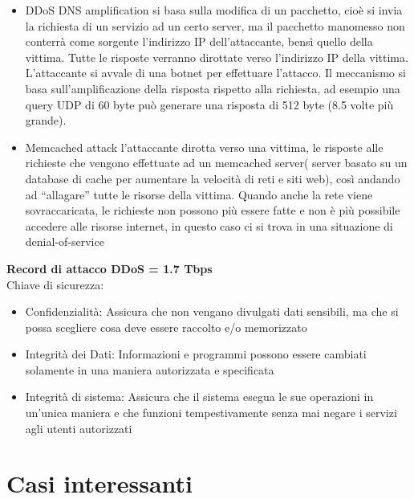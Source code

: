 \documentclass[8pt]{extarticle}
\begin{document}
\begin{itemize}
    \item DDoS DNS amplification si basa sulla modifica di un pacchetto, cioè si invia la richiesta di un servizio ad un certo server, 
    ma il pacchetto manomesso non conterrà come sorgente l’indirizzo IP dell’attaccante, bensì quello della vittima. Tutte le risposte 
    verranno dirottate verso l’indirizzo IP della vittima. L’attaccante si avvale di una botnet per effettuare l’attacco. Il meccanismo 
    si basa sull’amplificazione della risposta rispetto alla richiesta, ad esempio una query UDP di 60 byte può generare una risposta 
    di 512 byte (8.5 volte più grande).
    \item Memcached attack l’attaccante dirotta verso una vittima, le risposte alle richieste che vengono effettuate ad un memcached 
    server( server basato su un database di cache per aumentare la velocità di reti e siti web), così andando ad “allagare” tutte le 
    risorse della vittima. Quando anche la rete viene sovraccaricata, le richieste non possono più essere fatte e non è più possibile 
    accedere alle risorse internet, in questo caso ci si trova in una situazione di denial-of-service
\end{itemize}
\textbf{Record di attacco DDoS = 1.7 Tbps} \\
Chiave di sicurezza:
\begin{itemize}
    \item Confidenzialità: Assicura che non vengano divulgati dati sensibili, ma che si possa scegliere cosa deve essere raccolto e/o memorizzato
    \item Integrità dei Dati: Informazioni e programmi possono essere cambiati solamente in una maniera autorizzata e specificata
    \item Integrità di sistema: Assicura che il sistema esegua le sue operazioni in un’unica maniera e che funzioni tempestivamente senza mai 
    negare i servizi agli utenti autorizzati
\end{itemize}
\section{Casi interessanti}
\end{document}

